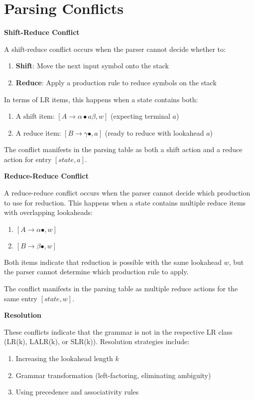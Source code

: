\section{Parsing Conflicts}

\textbf{Shift-Reduce Conflict}

A shift-reduce conflict occurs when the parser cannot decide whether to:
\begin{enumerate}
\item \textbf{Shift}: Move the next input symbol onto the stack
\item \textbf{Reduce}: Apply a production rule to reduce symbols on the stack
\end{enumerate}

In terms of LR items, this happens when a state contains both:
\begin{enumerate}
\item A shift item: $[A \to \alpha \bullet a \beta, w]$ (expecting terminal $a$)
\item A reduce item: $[B \to \gamma \bullet, a]$ (ready to reduce with lookahead $a$)
\end{enumerate}

The conflict manifests in the parsing table as both a shift action and a reduce action for entry $[state, a]$.


\textbf{Reduce-Reduce Conflict}

A reduce-reduce conflict occurs when the parser cannot decide which production to use for reduction. This happens when a state contains multiple reduce items with overlapping lookaheads:
\begin{enumerate}
\item $[A \to \alpha \bullet, w]$
\item $[B \to \beta \bullet, w]$
\end{enumerate}

Both items indicate that reduction is possible with the same lookahead $w$, but the parser cannot determine which production rule to apply.

The conflict manifests in the parsing table as multiple reduce actions for the same entry $[state, w]$.


\textbf{Resolution}

These conflicts indicate that the grammar is not in the respective LR class (LR(k), LALR(k), or SLR(k)). Resolution strategies include:
\begin{enumerate}
\item Increasing the lookahead length $k$
\item Grammar transformation (left-factoring, eliminating ambiguity)
\item Using precedence and associativity rules
\end{enumerate}
